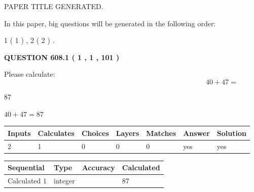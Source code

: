 \documentclass[12pt]{article}
\begin{document}
   
 PAPER TITLE GENERATED.
   
   
   
\vspace{0.2in}
   
In this paper, big questions will be generated in the following order: 
   
   
   1 ( 1 )
 ,
   2 ( 2 )
 .
  
\vspace{0.2in}
  
{\textbf{\Large{QUESTION
608.1 
 ( 1 , 1 , 101 )
}}}
  
  
 
Please calculate:
\begin{equation}
40 +  %
47 = \nonumber
\end{equation}
 
 
 
\noindent{}
 
 

87
 
 
\noindent{}
 
 

 
 
 
\noindent{}
 
 

$ %
40 +  %
47=   %
87$
 
 
\noindent{}
 
 

 
   
   
   
   
\noindent\begin{tabular}{|l|l|l|l|l|l|l|}
 \hline
Inputs & Calculates & Choices & Layers & Matches & Answer & Solution \\ \hline
 2  & 
 1  & 
 0
  & 
 0  & 
 0  & 
  yes & 
  yes 
  \\ \hline
 \end{tabular}
   
   
   
   
\noindent{}
   
   
  
  
\noindent\begin{tabular}{|l|l|l|l|}
\hline
 Sequential & Type & Accuracy & Calculated \\ 
\hline
 
 
  Calculated $  1 $ & integer &  & 
  $ 87 $ 
 \\  \hline  
 \end{tabular}
   
\end{document}
